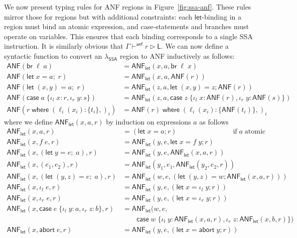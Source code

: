 \documentclass[acmsmall,screen,review]{acmart}
\newcommand{\ms}[1]{\ensuremath{\mathsf{#1}}}
\newcommand{\lto}{:}
\newcommand{\linl}[1]{\iota_l\;{#1}}
\newcommand{\linr}[1]{\iota_r\;{#1}}
\newcommand{\labort}[1]{\ms{abort}\;{#1}}
\newcommand{\letexpr}[3]{\ensuremath{\ms{let}\;#1 = #2;\;#3}}
\newcommand{\caseexpr}[5]{\ms{case}\;#1\;\{\linl{#2} \lto #3, \linr{#4} \lto #5\}}
\newcommand{\letstmt}[3]{\ensuremath{\ms{let}\;#1 = #2; #3}}
\newcommand{\brb}[2]{\ms{br}\;#1\;#2}
\newcommand{\casestmt}[5]{\ms{case}\;#1\;\{\linl{#2} \lto #3, \linr{#4} \lto #5\}}
\newcommand{\where}[2]{#1\;\ms{where}\;#2}
\newcommand{\wbranch}[3]{#1(#2) \lto \{#3\}}
\newcommand{\ahaslb}[3]{#1 \vdash^{\ms{anf}} #2 \rhd #3}
\newcommand{\toanf}[1]{\ms{ANF}(#1)}
\newcommand{\letanf}[3]{\ms{ANF}_{\ms{let}}(#1, #2, #3)}
\newcommand{\isotopessa}{\(\lambda_{\ms{SSA}}\)}
\begin{document}
We now present typing rules for ANF regions in Figure~\ref{fig:ssa-anf}. These rules mirror those
for regions but with additional constraints: each \ms{let}-binding in a region must bind an atomic
expression, and case-statements and branches must operate on variables. This ensures that each
binding corresponds to a single SSA instruction. It is similarly obvious that
$\ahaslb{\Gamma}{r}{\ms{L}}$. We can now define a syntactic function to convert an \isotopessa{}
region to ANF inductively as follows:
\begin{equation}
  \begin{aligned}
    \toanf{\brb{\ell}{a}} &= \letanf{x}{a}{\brb{\ell}{x}} \\
    \toanf{\letexpr{x}{a}{r}} &= \letanf{x}{a}{\toanf{r}} \\
    \toanf{\letexpr{(x, y)}{a}{r}} &= \letanf{z}{a}{\letstmt{(x, y)}{z}{\toanf{r}}} \\
    \toanf{\casestmt{a}{x}{r}{y}{s}} &= \letanf{z}{a}{\casestmt{z}{x}{\toanf{r}}{y}{\toanf{s}}} \\
    \toanf{\where{r}{(\wbranch{\ell_i}{x_i}{t_i},)_i}}
      &= \where{\toanf{r}}{(\wbranch{\ell_i}{x_i}{\toanf{t_i}},)_i}
  \end{aligned}
\end{equation}
where we define $\letanf{x}{a}{r}$ by induction on expressions $a$ as follows
\begin{equation}
  \begin{aligned}
    \letanf{x}{a}{r} &= (\letstmt{x}{a}{r}) \hspace{8em} \text{if}\;a\;\text{atomic} \\
    \letanf{x}{f\;e}{r} &= \letanf{y}{e}{\letstmt{x}{f\;y}{r}} \\
    \letanf{x}{(\letexpr{y}{e}{a})}{r} &= \letanf{y}{e}{\letanf{x}{a}{r}} \\
    \letanf{x}{(e_1, e_2)}{r} &= \letanf{y_1}{e_1}{\letanf{y_2}{e_2}{r}} \\
    \letanf{x}{(\letexpr{(y, z)}{e}{a})}{r} 
      &= \letanf{w}{e}{(\letstmt{(y, z)}{w}{\letanf{x}{a}{r}})} \\
    \letanf{x}{\linl{e}}{r} &= \letanf{y}{e}{(\letstmt{x}{\linl{y}}{r})} \\
    \letanf{x}{\linr{e}}{r} &= \letanf{y}{e}{(\letstmt{x}{\linr{y}}{r})} \\
    \letanf{x}{\caseexpr{e}{y}{a}{z}{b}}{r} &= 
      \letanf{w}{e}{\\ & \qquad \casestmt{w}{y}{\letanf{x}{a}{r}}{z}{\letanf{x}{b}{r}}} \\
    \letanf{x}{\labort{e}}{r} &= \letanf{y}{e}{(\letstmt{x}{\labort{y}}{r})}
  \end{aligned}
\end{equation}
\end{document}
